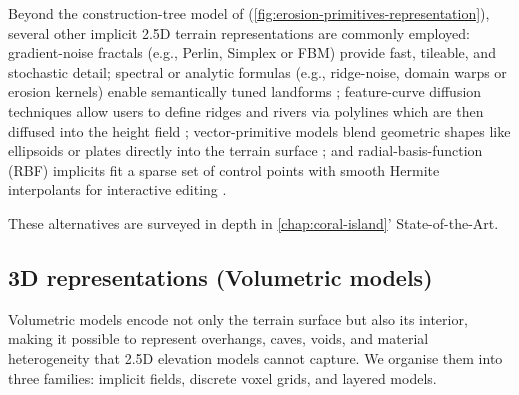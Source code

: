 Beyond the construction-tree model of \cite{Genevaux2015} (\cref{fig:erosion-primitives-representation}), several other implicit 2.5D terrain representations are commonly employed: gradient-noise fractals (e.g., Perlin, Simplex or FBM) provide fast, tileable, and stochastic detail; spectral or analytic formulas (e.g., ridge-noise, domain warps or erosion kernels) enable semantically tuned landforms ; feature-curve diffusion techniques allow users to define ridges and rivers via polylines which are then diffused into the height field ; vector-primitive models blend geometric shapes like ellipsoids or plates directly into the terrain surface ; and radial-basis-function (RBF) implicits fit a sparse set of control points with smooth Hermite interpolants for interactive editing .


These alternatives are surveyed in depth in \cref{chap:coral-island}' State-of-the-Art.

\subsection{3D representations (Volumetric models)}
Volumetric models encode not only the terrain surface but also its interior, making it possible to represent overhangs, caves, voids, and material heterogeneity that 2.5D elevation models cannot capture.
We organise them into three families: implicit fields, discrete voxel grids, and layered models.

